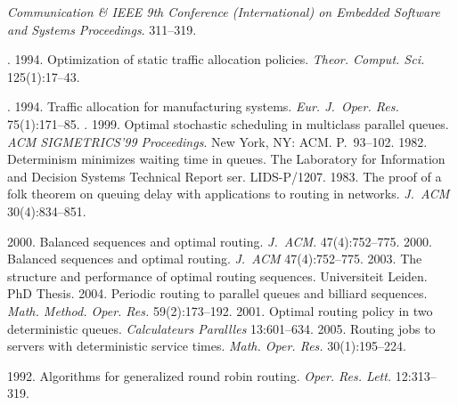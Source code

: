 \begin{multicols}{2}
{{\begin{thebibliography}{99}
\columnbreak

\noindent
 \textit{Communication  \& 
 IEEE 9th  Conference (International) on Embedded Software and Systems 
Proceedings}. 311--319.
    
    . 1994. Optimization of static traffic allocation 
policies. \textit{Theor. Comput. Sci.} 125(1):17--43.
   
    . 1994. Traffic allocation for manufacturing systems. 
\textit{Eur. J.~Oper. Res.} 75(1):171--85.
    . 1999. Optimal stochastic scheduling in 
multiclass parallel queues. \textit{ACM SIGMETRICS'99 Proceedings}. New York, NY: ACM. 
P.~93--102.
     1982. Determinism minimizes waiting time in queues. The Laboratory 
for Information and Decision Systems Technical Report ser. LIDS-P/1207.
     1983. The proof of a folk theorem on queuing delay with applications to 
routing in networks. \textit{J.~ACM} 30(4):834--851. 
    
     2000. Balanced sequences and optimal 
routing. \textit{J.~ACM}. 47(4):752--775. 
     2000. Balanced sequences and optimal 
routing. \textit{J.~ACM} 47(4):752--775. 
     2003. The structure and performance of optimal routing sequences.   
Universiteit Leiden. PhD Thesis.
     2004. Periodic routing to parallel queues and 
billiard sequences. \textit{Math. Method. Oper. Res.} 59(2):173--192.
     2001. 
    Optimal routing policy in two deterministic queues. 
\textit{Calculateurs \mbox{Parall{\!\!}les}} 13:601--634.
     2005. Routing jobs to servers with deterministic service times. 
\textit{Math. Oper. Res.} 30(1):195--224.
    
     1992. Algorithms for generalized round robin routing. 
\textit{Oper. Res. Lett.} 12:313--319.

\pagebreak


\end{thebibliography}}}
\end{multicols}
